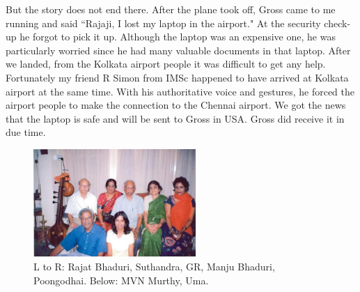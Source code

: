 But the story does not end there. After the plane took off, Gross came 
to me running and said ``Rajaji, I lost my laptop in the airport." At the 
security check-up he forgot to pick it up. Although the laptop was an 
expensive one, he was particularly worried since he had many valuable 
documents in that laptop. After we landed, from the Kolkata airport 
people it was difficult to get any help. Fortunately my friend R Simon 
from IMSc happened to have arrived at Kolkata airport at the same time. 
With his authoritative voice and gestures, he forced the airport people 
to make the connection to the Chennai airport. We got the news that the 
laptop is safe and will be sent to Gross in USA. Gross did receive it in 
due time.
\begin{figure}[h]
\centering
\includegraphics[width=0.55\textwidth]{images/Rajaji-family.jpg}
\caption{ L to R: Rajat Bhaduri, Suthandra, GR, Manju Bhaduri, Poongodhai.
Below: MVN Murthy, Uma.}
\end{figure}
